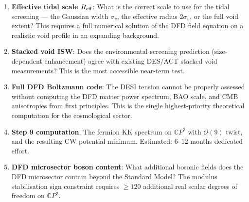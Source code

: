 \documentclass[11pt,a4paper]{article}
\newcommand{\CP}{\mathbb{C}P}
\begin{document}
\begin{tcolorbox}[colback=green!5!white, colframe=green!60!black,
  title=\textbf{Remaining Open Questions}]

\begin{enumerate}
\item \textbf{Effective tidal scale $R_{\rm eff}$}: What is the
  correct scale to use for the tidal screening --- the Gaussian
  width $\sigma_v$, the effective radius $2\sigma_v$, or the
  full void extent? This requires a full numerical solution of the
  DFD field equation on a realistic void profile in an expanding
  background.

\item \textbf{Stacked void ISW}: Does the environmental screening
  prediction (size-dependent enhancement) agree with existing DES/ACT
  stacked void measurements? This is the most accessible near-term
  test.

\item \textbf{Full DFD Boltzmann code}: The DESI tension cannot
  be properly assessed without computing the DFD matter power spectrum,
  BAO scale, and CMB anisotropies from first principles. This is
  the single highest-priority theoretical computation for the
  cosmological sector.

\item \textbf{Step 9 computation}: The fermion KK spectrum on $\CP^2$
  with $\mathcal{O}(9)$ twist, and the resulting CW potential
  minimum. Estimated: 6--12 months dedicated effort.

\item \textbf{DFD microsector boson content}: What additional bosonic
  fields does the DFD microsector contain beyond the Standard Model?
  The modulus stabilisation sign constraint requires $\geq 120$
  additional real scalar degrees of freedom on $\CP^2$.
\end{enumerate}
\end{tcolorbox}
\end{document}
